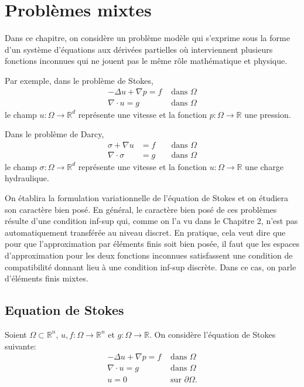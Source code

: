 \chapter{ Problèmes mixtes}

Dans ce chapitre, on considère un problème modèle qui s'exprime sous la forme d'un système d'équations aux dérivées partielles où interviennent plusieurs fonctions inconnues qui ne jouent pas le même rôle mathématique et physique. 

Par exemple, dans le problème de Stokes,
$$
\begin{aligned}
-\Delta u+\nabla p=f & \text { dans } \Omega \\
\nabla \cdot u=g & \text { dans } \Omega
\end{aligned}
$$
le champ $u: \Omega \rightarrow \mathbb{R}^{d}$ représente une vitesse et la fonction $p: \Omega \rightarrow \mathbb{R}$ une pression. 

Dans le problème de Darcy,
$$
\begin{aligned}
\sigma+\nabla u &=f & & \text { dans } \Omega \\
\nabla \cdot \sigma &=g & & \text { dans } \Omega
\end{aligned}
$$
le champ $\sigma: \Omega \rightarrow \mathbb{R}^{d}$ représente une vitesse et la fonction $u: \Omega \rightarrow \mathbb{R}$ une charge hydraulique. 

On établira la   formulation variationnelle de l'équation de Stokes et on étudiera son caractère bien posé.
En général, le caractère bien posé de ces problèmes résulte d'une condition inf-sup qui, comme on l'a vu dans le Chapitre 2, n'est pas automatiquement transférée au niveau discret. En pratique, cela veut dire que pour que l'approximation par éléments finis soit bien posée, il faut que les espaces d'approximation pour les deux fonctions inconnues satisfassent une condition de compatibilité donnant lieu à une condition inf-sup discrète. Dans ce cas, on parle d'éléments finis mixtes.

\section{Equation de Stokes}


Soient $\Omega\subset \mathbb{R}^n$, $u,f :  \Omega\longrightarrow \mathbb{R}^n$ et $g :  \Omega\longrightarrow \mathbb{R}$.   On considère l'équation de Stokes suivante:
$$
\begin{aligned}
-\Delta u+\nabla p=f & \text { dans } \Omega \\
\nabla \cdot u=g & \text { dans } \Omega\\
u=0& \text { sur  } \partial \Omega.
\end{aligned}
$$

